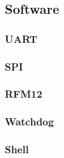 \subsection{Software}
\subsubsection{UART}
\subsubsection{SPI}
\subsubsection{RFM12}
\subsubsection{Watchdog}
\subsubsection{Shell}
